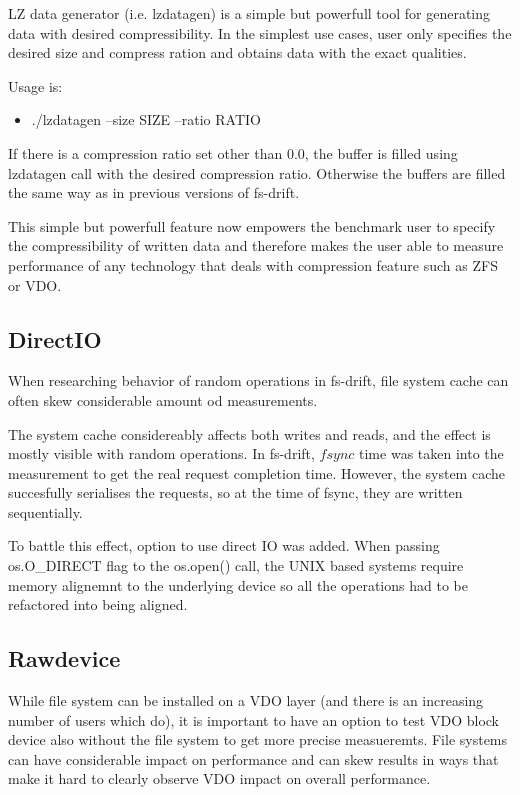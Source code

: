 \documentclass[
  color, %
  table, %
  lof,   %
  lot,   %
]{fithesis3}
\begin{document}
LZ data generator (i.e. lzdatagen) is a simple but powerfull tool for generating data with desired compressibility. In the simplest use cases, user only specifies the desired size and compress ration and obtains data with the exact qualities.

Usage is:
\begin{itemize}
    \item ./lzdatagen --size SIZE --ratio RATIO
\end{itemize}

If there is a compression ratio set other than 0.0, the buffer is filled using lzdatagen call with the desired compression ratio. Otherwise the buffers are filled the same way as in previous versions of fs-drift.

This simple but powerfull feature now empowers the benchmark user to specify the compressibility of written data and therefore makes the user able to measure performance of any technology that deals with compression feature such as ZFS or VDO.


\subsection{DirectIO}
When researching behavior of random operations in fs-drift, file system cache can often skew considerable amount od measurements.


The system cache considereably affects both writes and reads, and the effect is mostly visible with random operations. In fs-drift, $fsync$ time was taken into the measurement to get the real request completion time. However, the system cache succesfully serialises the requests, so at the time of fsync, they are written sequentially.

To battle this effect, option to use direct IO was added. When passing os.O\_DIRECT flag to the os.open() call, the UNIX based systems require memory alignemnt to the underlying device so all the operations had to be refactored into being aligned.

\subsection{Rawdevice}
While file system can be installed on a VDO layer (and there is an increasing number of users which do), it is important to have an option to test VDO block device also without the file system to get more precise measueremts. File systems can have considerable impact on performance and can skew results in ways that make it hard to clearly observe VDO impact on overall performance.
\end{document}
